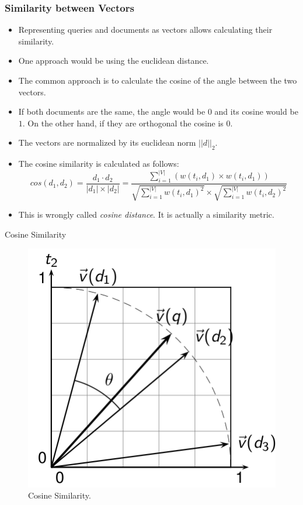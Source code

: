 \documentclass[handout]{beamer}
\begin{document}
\begin{frame}\frametitle{Similarity between Vectors}
\footnotesize{
\begin{itemize}
 \item Representing queries and documents as vectors allows calculating their similarity.
 \item One approach would be using the euclidean distance.
 
 \item The common approach is to calculate the cosine of the angle between the two vectors.
 \item If both documents are the same, the angle would be $0$ and its cosine would be $1$. On the other hand, if they are orthogonal  the cosine is $0$.
 \item The vectors are normalized by its euclidean norm $||d||_{2}$.
 \item The cosine similarity is calculated as follows:
 \begin{displaymath}
 cos(d_{1},d_{2})= \frac{d_{1}\cdot d_{2}}{|d_{1}|\times|d_{2}|} = \frac{\sum_{i=1}^{|V|}(w(t_{i},d_{1})\times w(t_{i},d_{1}))}{\sqrt{\sum_{i=1}^{|V|} w(t_{i},d_{1})^2}\times \sqrt{\sum_{i=1}^{|V|} w(t_{i},d_{2})^2}}
\end{displaymath}
\item This is wrongly called \emph{cosine distance}. It is actually a similarity metric.
\end{itemize}


}
\end{frame}

\begin{frame}{Cosine Similarity}

\begin{figure}[h!]
	\centering
	\includegraphics[scale=0.5]{pics/cos.png}
	\caption{ Cosine Similarity.}
\end{figure}

\end{frame}
\end{document}
